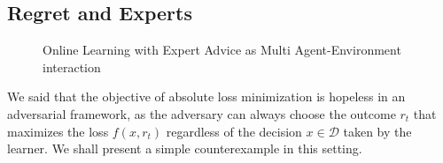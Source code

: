 


\subsection{Regret and Experts}
\begin{figure}[t!]
    \centering
    
\caption{Online Learning with Expert Advice as Multi Agent-Environment interaction}
\label{fig:OL}
\end{figure}
We said that the objective of absolute loss minimization is hopeless in an adversarial framework, as the adversary can always choose the outcome $r_t$ that maximizes the loss $f(x,r_t)$ regardless of the decision $x\in\mathcal D$ taken by the learner. We shall present a simple counterexample in this setting.

